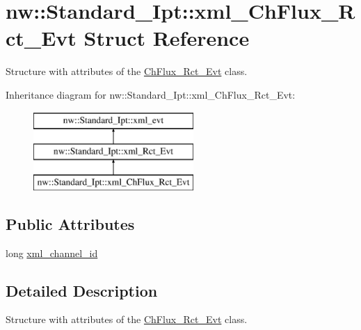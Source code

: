 \hypertarget{structnw_1_1_standard___ipt_1_1xml___ch_flux___rct___evt}{\section{nw\+:\+:Standard\+\_\+\+Ipt\+:\+:xml\+\_\+\+Ch\+Flux\+\_\+\+Rct\+\_\+\+Evt Struct Reference}
\label{structnw_1_1_standard___ipt_1_1xml___ch_flux___rct___evt}
}


Structure with attributes of the \hyperlink{classnw_1_1_ch_flux___rct___evt}{Ch\+Flux\+\_\+\+Rct\+\_\+\+Evt} class.  


Inheritance diagram for nw\+:\+:Standard\+\_\+\+Ipt\+:\+:xml\+\_\+\+Ch\+Flux\+\_\+\+Rct\+\_\+\+Evt\+:\begin{figure}[H]
\begin{center}
\leavevmode
\includegraphics[height=3.000000cm]{d1/d63/structnw_1_1_standard___ipt_1_1xml___ch_flux___rct___evt}
\end{center}
\end{figure}
\subsection*{Public Attributes}
\begin{DoxyCompactItemize}
\item 
long \hyperlink{structnw_1_1_standard___ipt_1_1xml___ch_flux___rct___evt_aa0a4cb6a01e33f4cc0162b1d49a3041c}{xml\+\_\+channel\+\_\+id}
\end{DoxyCompactItemize}


\subsection{Detailed Description}
Structure with attributes of the \hyperlink{classnw_1_1_ch_flux___rct___evt}{Ch\+Flux\+\_\+\+Rct\+\_\+\+Evt} class. 

